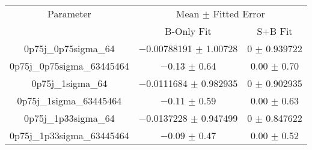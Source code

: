 \begin{scriptsize}
\begin{table}
\centering
\begin{tabular}{ccc}
\toprule
Parameter & \multicolumn{2}{c}{{Mean $\pm$ Fitted Error}}\\
 & {B-Only Fit} & {S+B Fit}\\
\midrule
0p75j\_0p75sigma\_64 & \num{-0.00788191} $\pm$ \num{1.00728} & \num{0} $\pm$ \num{0.939722}\\
0p75j\_0p75sigma\_63445464 & \num{-0.13} $\pm$ \num{0.64} & \num{+0.00} $\pm$ \num{0.70}\\
0p75j\_1sigma\_64 & \num{-0.0111684} $\pm$ \num{0.982935} & \num{0} $\pm$ \num{0.902935}\\
0p75j\_1sigma\_63445464 & \num{-0.11} $\pm$ \num{0.59} & \num{+0.00} $\pm$ \num{0.63}\\
0p75j\_1p33sigma\_64 & \num{-0.0137228} $\pm$ \num{0.947499} & \num{0} $\pm$ \num{0.847622}\\
0p75j\_1p33sigma\_63445464 & \num{-0.09} $\pm$ \num{0.47} & \num{+0.00} $\pm$ \num{0.52}\\
\bottomrule
\end{tabular}
\end{table}
\end{scriptsize}
